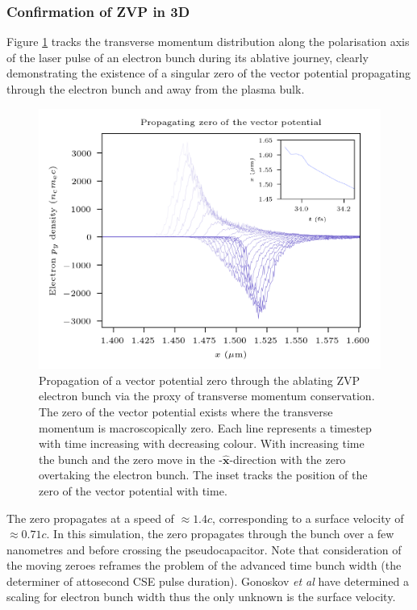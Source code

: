 \subsubsection{Confirmation of ZVP in 3D}
Figure \ref{fig:zvppropagatingzero} tracks the transverse momentum distribution along the polarisation axis of the laser pulse of an electron bunch during its ablative journey, clearly demonstrating the existence of a singular zero of the vector potential propagating through the electron bunch and away from the plasma bulk.
\begin{figure}
	\centering
	\includegraphics[width=0.7\linewidth]{figures/zvp/zvp_propagating_zero}
	\caption[Propagation of a vector potential zero through the ablating ZVP electron bunch.]{Propagation of a vector potential zero through the ablating ZVP electron bunch via the proxy of transverse momentum conservation. The zero of the vector potential exists where the transverse momentum is macroscopically zero. Each line represents a timestep with time increasing with decreasing colour. With increasing time the bunch and the zero move in the -$\hat{\mathbf{x}}$-direction with the zero overtaking the electron bunch. The inset tracks the position of the zero of the vector potential with time.}
	\label{fig:zvppropagatingzero}
\end{figure}
The zero propagates at a speed of $\approx 1.4c$, corresponding to a surface velocity of $\approx 0.71c$. In this simulation, the zero propagates through the bunch over a few nanometres and before crossing the pseudocapacitor. Note that consideration of the moving zeroes reframes the problem of the advanced time bunch width \cite{edwardsXRayEmissionEffectiveness2020} (the determiner of attosecond CSE pulse duration). Gonoskov \textit{et al} have determined a scaling for electron bunch width \cite{gonoskovUltrarelativisticNanoplasmonicsRoute2011} thus the only unknown is the surface velocity.


